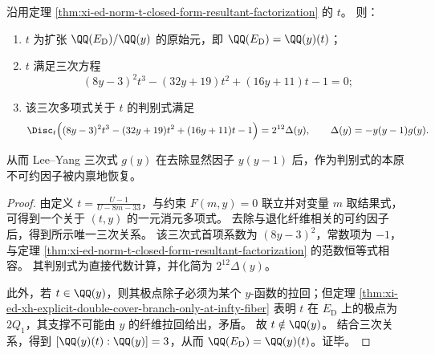 \begin{theorem}\label{thm:xi-ed-t-primitive-element-cubic-model-discriminant}
沿用定理 \ref{thm:xi-ed-norm-t-closed-form-resultant-factorization} 的 \(t\)。
则：
\begin{enumerate}
  \item \(t\) 为扩张 \(\QQ(E_{\mathrm D})/\QQ(y)\) 的原始元，即 \(\QQ(E_{\mathrm D})=\QQ(y)(t)\)；
  \item \(t\) 满足三次方程
  \[
  (8y-3)^2t^3-(32y+19)t^2+(16y+11)t-1=0;
  \]
  \item 该三次多项式关于 \(t\) 的判别式满足
  \[
  \Disc_t\Bigl((8y-3)^2t^3-(32y+19)t^2+(16y+11)t-1\Bigr)
  =2^{12}\Delta(y),
  \qquad
  \Delta(y)=-y(y-1)g(y).
  \]
\end{enumerate}
从而 Lee--Yang 三次式 \(g(y)\) 在去除显然因子 \(y(y-1)\) 后，作为判别式的本原不可约因子被内禀地恢复。
\end{theorem}
\begin{proof}
由定义 \(t=\frac{U-1}{U-8m-33}\)，与约束 \(F(m,y)=0\) 联立并对变量 \(m\) 取结果式，可得到一个关于 \((t,y)\) 的一元消元多项式。
去除与退化纤维相关的可约因子后，得到所示唯一三次关系。
该三次式首项系数为 \((8y-3)^2\)，常数项为 \(-1\)，与定理 \ref{thm:xi-ed-norm-t-closed-form-resultant-factorization} 的范数恒等式相容。
其判别式为直接代数计算，并化简为 \(2^{12}\Delta(y)\)。

此外，若 \(t\in\QQ(y)\)，则其极点除子必须为某个 \(y\)-函数的拉回；但定理 \ref{thm:xi-ed-xh-explicit-double-cover-branch-only-at-infty-fiber} 表明 \(t\) 在 \(E_{\mathrm D}\) 上的极点为 \(2Q_1\)，其支撑不可能由 \(y\) 的纤维拉回给出，矛盾。
故 \(t\notin\QQ(y)\)。
结合三次关系，得到 \([\QQ(y)(t):\QQ(y)]=3\)，从而 \(\QQ(E_{\mathrm D})=\QQ(y)(t)\)。证毕。
\end{proof}

\endinput

